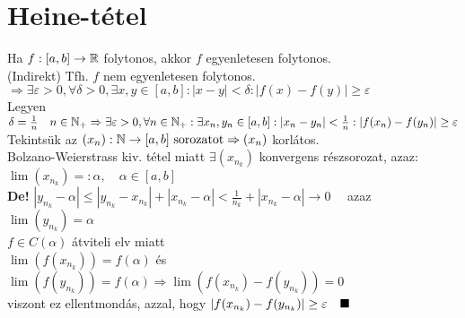 \documentclass[a4paper,11pt]{article}
\begin{document}
\section{Heine-tétel}
\tetel Ha $f:[a,b]\to\mathbb{R}$ folytonos, akkor $f$ egyenletesen folytonos.\\[0.1cm]
\biz (Indirekt) Tfh. $f$ nem egyenletesen folytonos.\\[0.1cm]
$\Rightarrow\exists\varepsilon>0,\forall\delta>0,\exists x,y\in[a,b]:|x-y|<\delta:
|f(x)-f(y)|\geq\varepsilon$\\[0.1cm] Legyen $\delta=\frac{1}{n}\quad n\in\mathbb{N}_+
\Rightarrow\exists\varepsilon>0,\forall n\in\mathbb{N}_+:\exists x_n,y_n\in[a,b]:|x_n-y_n|
<\frac{1}{n}:|f(x_n)-f(y_n)|\geq\varepsilon$ \\[0.1cm] Tekintsük az $(x_n): 
\mathbb{N}\to[a,b]\text{ sorozatot}\Rightarrow (x_n)$ korlátos.\\[0.1cm]
Bolzano-Weierstrass kiv. tétel miatt $\exists(x_{n_k})$ konvergens részsorozat,
azaz:\\[0.1cm] $\lim(x_{n_k})=:\alpha,\quad\alpha\in[a,b]$\\[0.1cm]\textbf{De!}
$|y_{n_k}-\alpha|\leq|y_{n_k}-x_{n_k}|+|x_{n_k}-\alpha|<\frac{1}{n_k}
+|x_{n_k}-\alpha|\to0\quad$ azaz $\lim(y_{n_k})=\alpha$\\[0.1cm] $f\in C(\alpha)$
átviteli elv miatt\\[0.1cm]$\lim(f(x_{n_k}))=f(\alpha)$ és $\lim(f(y_{n_k}))=
f(\alpha)\Rightarrow\lim(f(x_{n_k})-f(y_{n_k}))=0$\\[0.1cm] viszont ez
ellentmondás, azzal, hogy $|f(x_{n_k})-f(y_{n_k})|\geq\varepsilon\quad\blacksquare$
\end{document}
